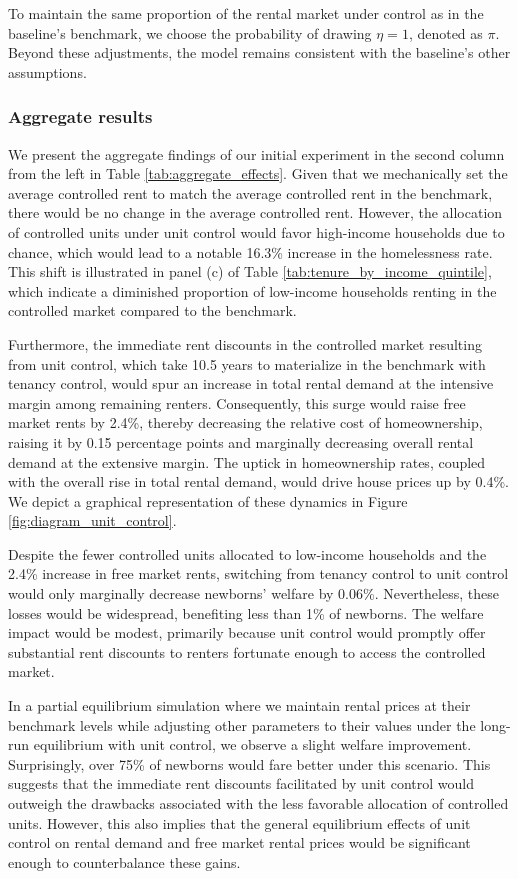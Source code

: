 \documentclass[parskip=full]{article}
\begin{document}
To maintain the same proportion of the rental market under control as in the baseline's benchmark, we choose the probability of drawing $\eta = 1$, denoted as $\pi$. Beyond these adjustments, the model remains consistent with the baseline's other assumptions.

\subsubsection{Aggregate results}

We present the aggregate findings of our initial experiment in the second column from the left in Table \ref{tab:aggregate_effects}. Given that we mechanically set the average controlled rent to match the average controlled rent in the benchmark, there would be no change in the average controlled rent. However, the allocation of controlled units under unit control would favor high-income households due to chance, which would lead to a notable 16.3\% increase in the homelessness rate. This shift is illustrated in panel (c) of Table \ref{tab:tenure_by_income_quintile}, which indicate a diminished proportion of low-income households renting in the controlled market compared to the benchmark.

Furthermore, the immediate rent discounts in the controlled market resulting from unit control, which take 10.5 years to materialize in the benchmark with tenancy control, would spur an increase in total rental demand at the intensive margin among remaining renters. Consequently, this surge would raise free market rents by 2.4\%, thereby decreasing the relative cost of homeownership, raising it by 0.15 percentage points and marginally decreasing overall rental demand at the extensive margin. The uptick in homeownership rates, coupled with the overall rise in total rental demand, would drive house prices up by 0.4\%. We depict a graphical representation of these dynamics in Figure \ref{fig:diagram_unit_control}.

Despite the fewer controlled units allocated to low-income households and the 2.4\% increase in free market rents, switching from tenancy control to unit control would only marginally decrease newborns' welfare by 0.06\%. Nevertheless, these losses would be widespread, benefiting less than 1\% of newborns. The welfare impact would be modest, primarily because unit control would promptly offer substantial rent discounts to renters fortunate enough to access the controlled market.

In a partial equilibrium simulation where we maintain rental prices at their benchmark levels while adjusting other parameters to their values under the long-run equilibrium with unit control, we observe a slight welfare improvement. Surprisingly, over 75\% of newborns would fare better under this scenario. This suggests that the immediate rent discounts facilitated by unit control would outweigh the drawbacks associated with the less favorable allocation of controlled units. However, this also implies that the general equilibrium effects of unit control on rental demand and free market rental prices would be significant enough to counterbalance these gains.
\end{document}

